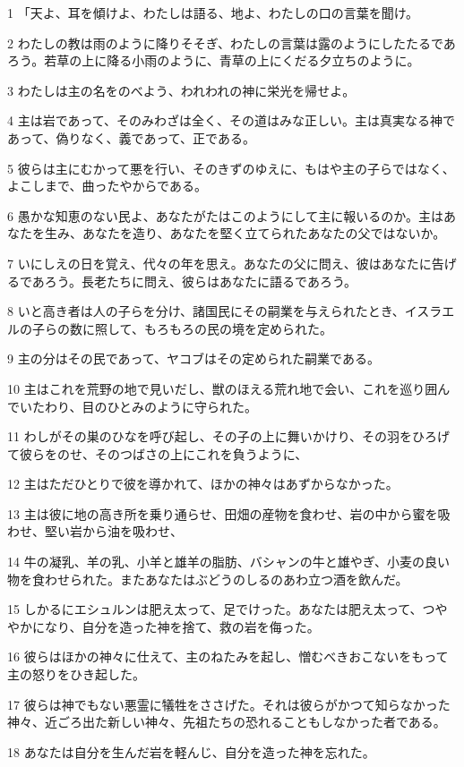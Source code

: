 \par 1 「天よ、耳を傾けよ、わたしは語る、地よ、わたしの口の言葉を聞け。
\par 2 わたしの教は雨のように降りそそぎ、わたしの言葉は露のようにしたたるであろう。若草の上に降る小雨のように、青草の上にくだる夕立ちのように。
\par 3 わたしは主の名をのべよう、われわれの神に栄光を帰せよ。
\par 4 主は岩であって、そのみわざは全く、その道はみな正しい。主は真実なる神であって、偽りなく、義であって、正である。
\par 5 彼らは主にむかって悪を行い、そのきずのゆえに、もはや主の子らではなく、よこしまで、曲ったやからである。
\par 6 愚かな知恵のない民よ、あなたがたはこのようにして主に報いるのか。主はあなたを生み、あなたを造り、あなたを堅く立てられたあなたの父ではないか。
\par 7 いにしえの日を覚え、代々の年を思え。あなたの父に問え、彼はあなたに告げるであろう。長老たちに問え、彼らはあなたに語るであろう。
\par 8 いと高き者は人の子らを分け、諸国民にその嗣業を与えられたとき、イスラエルの子らの数に照して、もろもろの民の境を定められた。
\par 9 主の分はその民であって、ヤコブはその定められた嗣業である。
\par 10 主はこれを荒野の地で見いだし、獣のほえる荒れ地で会い、これを巡り囲んでいたわり、目のひとみのように守られた。
\par 11 わしがその巣のひなを呼び起し、その子の上に舞いかけり、その羽をひろげて彼らをのせ、そのつばさの上にこれを負うように、
\par 12 主はただひとりで彼を導かれて、ほかの神々はあずからなかった。
\par 13 主は彼に地の高き所を乗り通らせ、田畑の産物を食わせ、岩の中から蜜を吸わせ、堅い岩から油を吸わせ、
\par 14 牛の凝乳、羊の乳、小羊と雄羊の脂肪、バシャンの牛と雄やぎ、小麦の良い物を食わせられた。またあなたはぶどうのしるのあわ立つ酒を飲んだ。
\par 15 しかるにエシュルンは肥え太って、足でけった。あなたは肥え太って、つややかになり、自分を造った神を捨て、救の岩を侮った。
\par 16 彼らはほかの神々に仕えて、主のねたみを起し、憎むべきおこないをもって主の怒りをひき起した。
\par 17 彼らは神でもない悪霊に犠牲をささげた。それは彼らがかつて知らなかった神々、近ごろ出た新しい神々、先祖たちの恐れることもしなかった者である。
\par 18 あなたは自分を生んだ岩を軽んじ、自分を造った神を忘れた。
